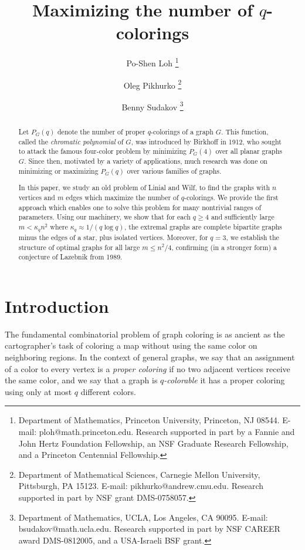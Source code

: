 \documentclass[11pt]{article}
\date{}
\title{\vspace{-1cm}Maximizing the number of $q$-colorings}
\author{
Po-Shen Loh \thanks{Department of Mathematics,
Princeton University, Princeton, NJ 08544. E-mail:
ploh@math.princeton.edu.
Research supported in part by a Fannie and John Hertz Foundation Fellowship, an NSF Graduate
Research Fellowship, and a Princeton Centennial Fellowship.}
\and
Oleg Pikhurko \thanks{Department of Mathematical Sciences, Carnegie Mellon University, Pittsburgh, PA 15123.  E-mail: pikhurko@andrew.cmu.edu.
Research supported in part by NSF grant DMS-0758057.}
\and
Benny Sudakov \thanks{Department of Mathematics, UCLA, Los Angeles, CA 90095. E-mail:
bsudakov@math.ucla.edu.
Research supported in part by NSF CAREER award DMS-0812005, and a USA-Israeli BSF grant.
}
}
\begin{document}
\maketitle


\begin{abstract}
  Let $P_G(q)$ denote the number of proper $q$-colorings of a graph
  $G$.  This function, called the \emph{chromatic polynomial}\/ of
  $G$, was introduced by Birkhoff in 1912, who sought to attack the
  famous four-color problem by minimizing $P_G(4)$ over all planar
  graphs $G$.  Since then, motivated by a variety of applications,
  much research was done on minimizing or maximizing $P_G(q)$ over
  various families of graphs.

  In this paper, we study an old problem of Linial and Wilf, to find
  the graphs with $n$ vertices and $m$ edges which maximize the number
  of $q$-colorings.  We provide the first approach which enables one
  to solve this problem for many nontrivial ranges of parameters.
  Using our machinery, we show that for each $q \geq 4$ and
  sufficiently large $m < \kappa_q n^2$ where $\kappa_q \approx 1/(q
  \log q)$, the extremal graphs are complete bipartite graphs minus
  the edges of a star, plus isolated vertices.  Moreover, for $q=3$,
  we establish the structure of optimal graphs for all large $m \leq
  n^2/4$, confirming (in a stronger form) a conjecture of Lazebnik
  from 1989.
\end{abstract}



\section{Introduction}


The fundamental combinatorial problem of graph coloring is as
ancient as the cartographer's task of coloring a map without using the
same color on neighboring regions.  In the context of general graphs,
we say that an assignment of a color to every vertex is a \emph{proper
  coloring}\/ if no two adjacent vertices receive the same color, and
we say that a graph is \emph{$q$-colorable}\/ it has a proper coloring
using only at most $q$ different colors.  
\end{document}
